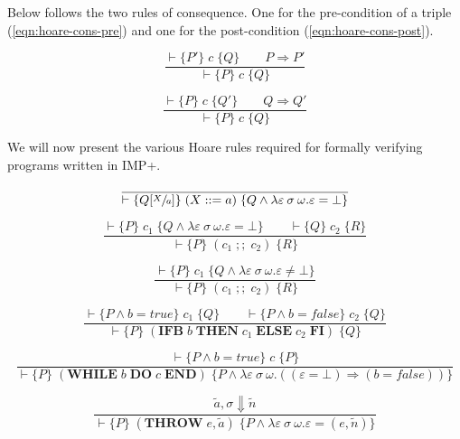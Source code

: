 Below follows the two rules of consequence. One for the pre-condition of a triple (\ref{eqn:hoare-cons-pre}) and one for the post-condition (\ref{eqn:hoare-cons-post}).

\begin{equation}\label{eqn:hoare-cons-pre}
\frac{\vdash\{P'\} \; c \; \{Q\} \qquad P \Rightarrow P'}{\vdash\{P\} \; c \; \{Q\}}
\end{equation}

\begin{equation}\label{eqn:hoare-cons-post}
\frac{\vdash\{P\} \; c \; \{Q'\} \qquad Q \Rightarrow Q'}{\vdash\{P\} \; c \; \{Q\}}
\end{equation}

We will now present the various Hoare rules required for formally verifying programs written in IMP+.

\begin{equation}\label{eqn:hoare-assign}
\frac{}{\vdash \{Q[\sfrac{X}{a}]\} \; (X ::= a) \; \{Q \wedge \lambda \varepsilon\:\sigma\:\omega. \varepsilon = \bot\}}
\end{equation}

\begin{equation}\label{eqn:hoare-seq}
\frac{\vdash \{P\} \; c_1 \; \{Q \wedge \lambda \varepsilon\:\sigma\:\omega. \varepsilon = \bot\} \qquad \vdash \{Q\} \; c_2 \; \{R\}}{\vdash \{P\} \; (c_1\; ;;\; c_2) \; \{R\}}
\end{equation}

\begin{equation}\label{eqn:hoare-seq-exn}
\frac{\vdash \{P\} \; c_1 \; \{Q \wedge \lambda \varepsilon\:\sigma\:\omega. \varepsilon \neq \bot\}}{\vdash \{P\} \; (c_1\; ;;\; c_2) \; \{R\}}
\end{equation}

\begin{equation}
\frac{\vdash \{P \wedge b=true\} \; c_1 \; \{Q\} \qquad \vdash \{P \wedge b=false\} \; c_2 \; \{Q\}}{\vdash \{P\} \; (\textbf{IFB}\; b\; \textbf{THEN}\; c_1\; \textbf{ELSE}\; c_2\; \textbf{FI}) \; \{Q\}}
\end{equation}

\begin{equation}
\frac{\vdash \{P \wedge b = true\} \; c \; \{P\}}{\vdash \{P\} \; (\textbf{WHILE}\; b\; \textbf{DO}\; c\; \textbf{END}) \; \{P \wedge \lambda \varepsilon\:\sigma\:\omega.((\varepsilon = \bot) \Rightarrow (b = false))\}}
\end{equation}

\begin{equation}\label{eqn:hoare-throw}
\frac{\tilde{a}, \sigma \Downarrow \tilde{n}}{\vdash \{P\} \; (\textbf{THROW}\; e, \tilde{a}) \; \{P \wedge \lambda \varepsilon\:\sigma\:\omega. \varepsilon = (e, \tilde{n})\}}
\end{equation}

